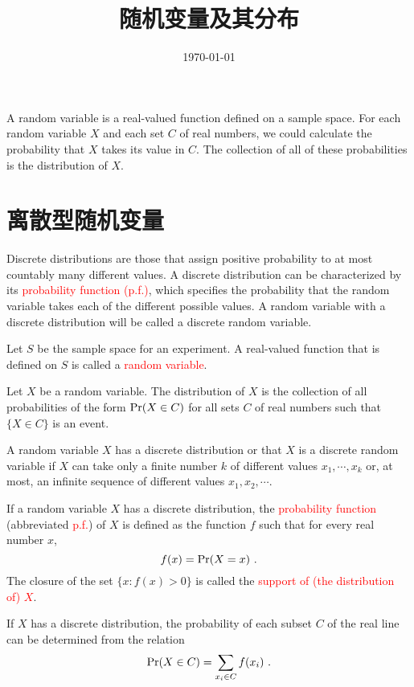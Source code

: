 \documentclass[12pt,a4paper]{article}
\title{随机变量及其分布}
\author{}
\date{\today}
\begin{document}
\maketitle
A random variable is a real-valued function defined on a sample space. For each random variable $X$ and each set $C$ of real numbers, we could calculate the probability that $X$ takes its value in $C$. The collection of all of these
probabilities is the distribution of $X$. 

\section{离散型随机变量}
Discrete distributions are those that assign positive probability to at most countably many different values. A discrete distribution can be characterized by its \textcolor{red}{probability function (p.f.)}, which specifies the probability that the random variable takes each of the different possible values. A random variable with a discrete distribution will be called a discrete random variable.

Let $S$ be the sample space for an experiment. A real-valued function that is defined on $S$ is called a \textcolor{red}{random variable}.

Let $X$ be a random variable. The distribution of $X$ is the collection of all probabilities of the form ${\rm Pr}(X \in C)$ for all sets $C$ of real numbers such that $\{X \in C\}$ is an event.

A random variable $X$ has a discrete distribution or that $X$ is a discrete random variable if $X$ can take only a finite number $k$ of different values $x_1, \cdots, x_k$ or, at most, an infinite sequence of different values $x_1, x_2, \cdots$.

If a random variable $X$ has a discrete distribution, the \textcolor{red}{probability function} (abbreviated \textcolor{red}{p.f.}) of $X$ is defined as the function $f$ such that for every real number $x$,
\begin{equation}
f(x) = {\rm Pr}(X = x) ~. 
\end{equation}
The closure of the set $\{x : f(x) > 0\}$ is called the \textcolor{red}{support of (the distribution of) $X$}.

If $X$ has a discrete distribution, the probability of each subset $C$ of the real line can be determined from the relation
\begin{equation*}
{\rm Pr}(X \in C) = \sum_{x_i \in C} f(x_i) ~.
\end{equation*}
\end{document}
